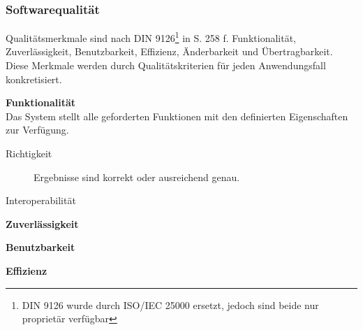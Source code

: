\subsubsection{Softwarequalität}
\label{softwarequalität}

Qualitätsmerkmale sind nach DIN 9126\footnote{DIN 9126 wurde durch ISO/IEC 25000 ersetzt, jedoch sind beide nur proprietär verfügbar} in \cite{book:lehrbuchsoftware} S. 258 f. Funktionalität, Zuverlässigkeit, Benutzbarkeit, Effizienz, Änderbarkeit und Übertragbarkeit.
Diese Merkmale werden durch Qualitätskriterien für jeden Anwendungsfall konkretisiert.

\textbf{Funktionalität}\\
Das System stellt alle geforderten Funktionen mit den definierten Eigenschaften zur Verfügung.
\begin{description}
\item[Richtigkeit] Ergebnisse sind korrekt oder ausreichend genau.
\item[Interoperabilität] 
\item[] 
\item[] 
\item[] 
\item[] 
\item[] 
\end{description}

\textbf{Zuverlässigkeit}\\
\begin{description}
\item[] 
\item[] 
\item[] 
\item[] 
\item[] 
\item[] 
\item[] 
\end{description}

\textbf{Benutzbarkeit}\\
\begin{description}
\item[] 
\item[] 
\item[] 
\item[] 
\item[] 
\item[] 
\item[] 
\end{description}

\textbf{Effizienz}\\
\begin{description}
\item[] 
\item[] 
\item[] 
\item[] 
\item[] 
\item[] 
\item[] 
\end{description}

